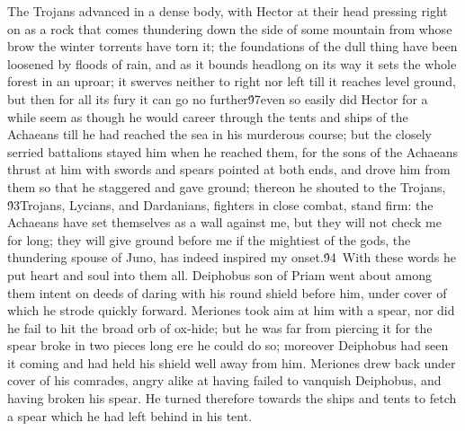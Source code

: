 {The Trojans advanced in a dense body, with Hector at their head pressing right on as a rock that comes thundering down the side of some mountain from whose brow the winter torrents have torn it; the foundations of the dull thing have been loosened by floods of rain, and as it bounds headlong on its way it sets the whole forest in an uproar; it swerves neither to right nor left till it reaches level ground, but then for all its fury it can go no further\'97even so easily did Hector for a while seem as though he would career through the tents and ships of the Achaeans till he had reached the sea in his murderous course; but the closely serried battalions stayed him when he reached them, for the sons of the Achaeans thrust at him with swords and spears pointed at both ends, and drove him from them so that he staggered and gave ground; thereon he shouted to the Trojans, \'93Trojans, Lycians, and Dardanians, fighters in close combat, stand firm: the Achaeans have set themselves as a wall against me, but they will not check me for long; they will give ground before me if the mightiest of the gods, the thundering spouse of Juno, has indeed inspired my onset.\'94\
With these words he put heart and soul into them all. Deiphobus son of Priam went about among them intent on deeds of daring with his round shield before him, under cover of which he strode quickly forward. Meriones took aim at him with a spear, nor did he fail to hit the broad orb of ox-hide; but he was far from piercing it for the spear broke in two pieces long ere he could do so; moreover Deiphobus had seen it coming and had held his shield well away from him. Meriones drew back under cover of his comrades, angry alike at having failed to vanquish Deiphobus, and having broken his spear. He turned therefore towards the ships and tents to fetch a spear which he had left behind in his tent.\
}
